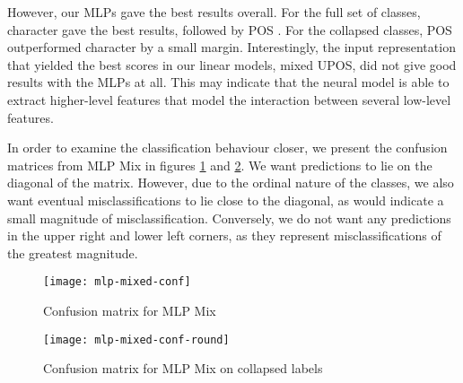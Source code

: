 However, our \acp{MLP} gave the best results overall. For the full set of
classes, character \ngrams gave the best results, followed by POS \ngrams.
For the collapsed classes, POS \ngrams outperformed character \ngrams by a
small margin. Interestingly, the input representation that yielded the best
scores in our linear models, mixed UPOS, did not give good results with the
\acp{MLP} at all. This may indicate that the neural model is able to extract
higher-level features that model the interaction between several low-level
\ngram features.

In order to examine the classification behaviour closer, we present the
confusion matrices from MLP Mix in figures \ref{fig:mlp-mixed-conf} and
\ref{fig:mlp-mixed-conf-round}. We want predictions to lie on the diagonal of
the matrix. However, due to the ordinal nature of the classes, we also want
eventual misclassifications to lie close to the diagonal, as would indicate a
small magnitude of misclassification. Conversely, we do not want any
predictions in the upper right and lower left corners, as they represent
misclassifications of the greatest magnitude.

\begin{figure}
  \centering
  \texttt{[image: mlp-mixed-conf]}
  \caption{Confusion matrix for MLP Mix}
  \label{fig:mlp-mixed-conf}
\end{figure}

\begin{figure}
  \centering
  \texttt{[image: mlp-mixed-conf-round]}
  \caption{Confusion matrix for MLP Mix on collapsed labels}
  \label{fig:mlp-mixed-conf-round}
\end{figure}
